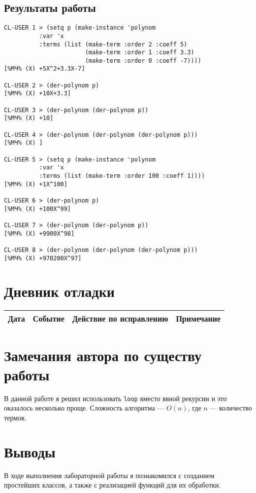 \documentclass[12pt]{article}
\begin{document}
\subsection{Результаты работы}
\begin{lstlisting}[escapechar=\%]
CL-USER 1 > (setq p (make-instance 'polynom
          :var 'x
          :terms (list (make-term :order 2 :coeff 5)
                       (make-term :order 1 :coeff 3.3)
                       (make-term :order 0 :coeff -7))))
[%МЧ% (X) +5X^2+3.3X-7]

CL-USER 2 > (der-polynom p)
[%МЧ% (X) +10X+3.3]

CL-USER 3 > (der-polynom (der-polynom p))
[%МЧ% (X) +10]

CL-USER 4 > (der-polynom (der-polynom (der-polynom p)))
[%МЧ% (X) ]

CL-USER 5 > (setq p (make-instance 'polynom
          :var 'x
          :terms (list (make-term :order 100 :coeff 1))))
[%МЧ% (X) +1X^100]

CL-USER 6 > (der-polynom p)
[%МЧ% (X) +100X^99]

CL-USER 7 > (der-polynom (der-polynom p))
[%МЧ% (X) +9900X^98]

CL-USER 8 > (der-polynom (der-polynom (der-polynom p)))
[%МЧ% (X) +970200X^97]
\end{lstlisting}

\section{Дневник отладки}
\begin{tabular}{|c|c|c|c|}
\hline
Дата & Событие & Действие по исправлению & Примечание \\
\hline
\end{tabular}

\section{Замечания автора по существу работы}
В данной работе я решил использовать {\tt loop} вместо явной рекурсии и это оказалось несколько проще. Сложность алгоритма --- $O(n)$, где $n$ --- количество термов.

\section{Выводы}
В ходе выполнения лабораторной работы я познакомился с созданием простейших классов, а также с реализацией функций для их обработки.
\end{document}
